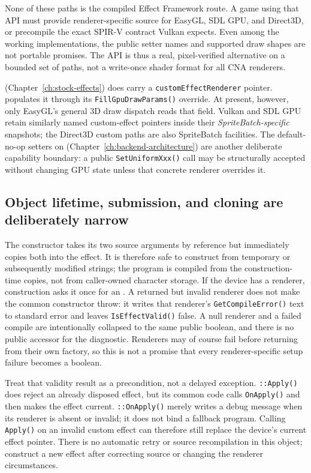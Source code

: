 None of these  paths is the compiled Effect Framework route. A game using
that API must provide renderer-specific source for EasyGL, SDL GPU, and Direct3D,
or precompile the exact SPIR-V contract Vulkan expects. Even among the working implementations,
the public setter names and supported draw shapes are not portable promises. The API is thus a
real, pixel-verified alternative on a bounded set of paths, not a write-once shader format for
all CNA renderers.

 (Chapter~\ref{ch:stock-effects}) does carry a
\texttt{customEffectRenderer} pointer.  populates it through its
\texttt{FillGpuDrawParams()} override. At present, however, only EasyGL's general 3D draw
dispatch reads that field.
Vulkan and SDL GPU retain similarly named custom-effect pointers inside their
\emph{SpriteBatch-specific} snapshots; the Direct3D custom paths are also SpriteBatch
facilities. The default-no-op setters on 
(Chapter~\ref{ch:backend-architecture}) are another deliberate capability boundary: a public
\texttt{SetUniformXxx()} call may be structurally accepted without changing GPU state unless
that concrete renderer overrides it.

\subsection{Object lifetime, submission, and cloning are deliberately narrow}

The constructor takes its two source arguments by reference but immediately copies both into
the effect. It is therefore safe to construct from temporary or subsequently modified strings;
the program is compiled from the construction-time copies, not from caller-owned character
storage. If the device has a renderer, construction asks it once for an
. A returned but invalid renderer does not make the common constructor
throw: it writes that renderer's \texttt{GetCompileError()} text to standard error and leaves
\texttt{IsEffectValid()} false. A null renderer and a failed compile are intentionally collapsed
to the same public boolean, and there is no public  accessor for the
diagnostic. Renderers may of course fail before returning from their own factory, so this is not a
promise that every renderer-specific setup failure becomes a boolean.

Treat that validity result as a precondition, not a delayed exception. \texttt{::Apply()}
does reject an already disposed effect, but its common code calls \texttt{OnApply()} and then
makes the effect current. \texttt{::OnApply()} merely writes a debug
message when its renderer is absent or invalid; it does not bind a fallback program. Calling
\texttt{Apply()} on an invalid custom effect can therefore still replace the device's current
effect pointer. There is no automatic retry or source recompilation in this object; construct a
new effect after correcting source or changing the renderer circumstances.

